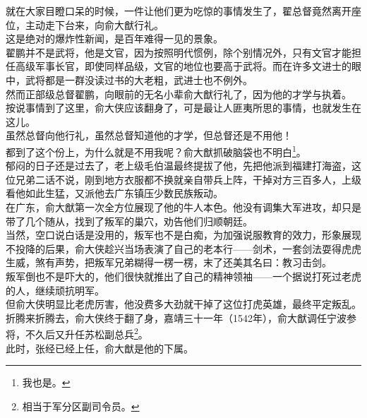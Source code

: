 \begin{multicols}{\theparacolNo}
就在大家目瞪口呆的时候，一件让他们更为吃惊的事情发生了，翟总督竟然离开座位，主动走下台来，向俞大猷行礼。\\

这是绝对的爆炸性新闻，是百年难得一见的景象。\\

翟鹏并不是武将，他是文官，因为按照明代惯例，除个别情况外，只有文官才能担任高级军事长官，即使同样品级，文官的地位也要高于武将。而在许多文进士的眼中，武将都是一群没读过书的大老粗，武进士也不例外。\\

然而正部级总督翟鹏，向眼前的无名小辈俞大猷行礼了，因为他的才学与执着。\\

按说事情到了这里，俞大侠应该翻身了，可是最让人匪夷所思的事情，也就发生在这儿。\\

虽然总督向他行礼，虽然总督知道他的才学，但总督还是不用他！\\

都到了这个份上，为什么就是不用我呢？俞大猷抓破脑袋也不明白\footnote{我也是。}。\\

郁闷的日子还是过去了，老上级毛伯温最终提拔了他，先把他派到福建打海盗，这位兄弟二话不说，刚到地方衣服都不换就亲自带兵上阵，干掉对方三百多人，上级看他如此生猛，又派他去广东镇压少数民族叛动。\\

在广东，俞大猷第一次全方位展现了他的牛人本色。他没有调集大军进攻，却只是带了几个随从，找到了叛军的巢穴，劝告他们归顺朝廷。\\

当然，空口说白话是没用的，叛军也不是白痴，为加强说服教育的效力，形象展现不投降的后果，俞大侠趁兴当场表演了自己的老本行——剑术，一套剑法耍得虎虎生威，煞有声势，把叛军兄弟糊得一楞一楞，末了还美其名曰：教习击剑。\\

叛军倒也不是吓大的，他们很快就推出了自己的精神领袖——一个据说打死过老虎的人，继续顽抗明军。\\

但俞大侠明显比老虎厉害，他没费多大劲就干掉了这位打虎英雄，最终平定叛乱。\\

折腾来折腾去，俞大侠终于翻了身，嘉靖三十一年（1542年），俞大猷调任宁波参将，不久后又升任苏松副总兵\footnote{相当于军分区副司令员。}。\\

此时，张经已经上任，俞大猷是他的下属。\\


\end{multicols}
